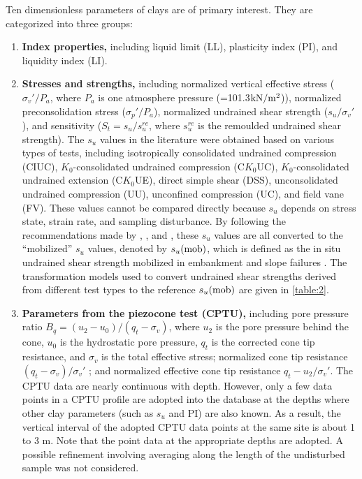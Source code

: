 \begin{paracol}{2}
    \switchcolumn*
    
    Ten dimensionless parameters of clays are of primary interest. They are categorized into three groups:
    \begin{enumerate}
        \item \textbf{Index properties,} including liquid limit (LL), plasticity index (PI), and liquidity index (LI). 
        
        \item \textbf{Stresses and strengths,} including normalized vertical effective stress ($\sigma_v'/P_a$, where $P_a$ is one atmosphere pressure (=101.3$\rm{kN/m^2}$)), normalized preconsolidation stress ($\sigma_p'/P_a$), normalized undrained shear strength ($s_u/\sigma_v'$), and sensitivity ($S_t=s_u/s_u^{re}$, where $s_u^{re}$ is the remoulded undrained shear strength). The $s_u$ values in the literature were obtained based on various types of tests, including isotropically consolidated undrained compression (CIUC), $K_0$-consolidated undrained compression (C$K_0$UC), $K_0$-consolidated undrained extension (C$K_0$UE), direct simple shear (DSS), unconsolidated undrained compression (UU), unconfined compression (UC), and field vane (FV). These values cannot be compared directly because $s_u$ depends on stress state, strain rate, and sampling disturbance. By following the recommendations made by \citet{Bjerrum19721}, \citet{Kulhawy1990}, and \citet{Mesri20071}, these $s_u$ values are all converted to the “mobilized” $s_u$ values, denoted by $s_u(\rm{mob})$, which is defined as the in situ undrained shear strength mobilized in embankment and slope failures \citep{Mesri20071}. The transformation models used to convert undrained shear strengths derived from different test types to the reference $s_u(\rm{mob})$ are given in \autoref{table:2}. 
        
        \item \textbf{Parameters from the piezocone test (CPTU),} including pore pressure ratio $B_q=(u_2-u_0)/(q_t-\sigma_v)$, where $u_2$ is the pore pressure behind the cone, $u_0$ is the hydrostatic pore pressure, $q_t$ is the corrected cone tip resistance, and $\sigma_v$ is the total effective stress; normalized cone tip resistance $(q_t-\sigma_v)/\sigma_v'$ ; and normalized effective cone tip resistance $q_t-u_2/\sigma_v'$. 
        The CPTU data are nearly continuous with depth. However, only a few data points in a CPTU profile are adopted into the database at the depths where other clay parameters (such as $s_u$ and PI) are also known. As a result, the vertical interval of the adopted CPTU data points at the same site is about 1 to 3 m. Note that the point data at the appropriate depths are adopted. A possible refinement involving averaging along the length of the undisturbed sample was not considered.
    \end{enumerate}


\end{paracol}
